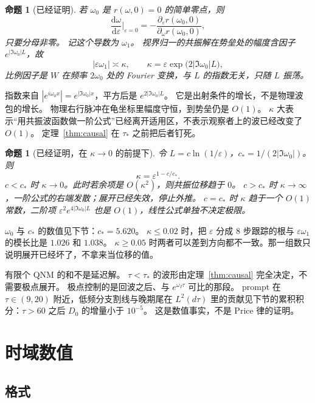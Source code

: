 \documentclass[11pt]{ctexart}
\newtheorem{proposition}[theorem]{命题}
\theoremstyle{definition}
\theoremstyle{remark}
\newcommand{\eps}{\varepsilon}
\newcommand{\rd}{\mathrm{d}}
\begin{document}
\begin{proposition}[已经证明]
\label{prop:shift}
若 $\omega_0$ 是 $r(\omega,0)=0$ 的简单零点，则
\[
\frac{\rd\omega}{\rd\eps}\Big|_{\eps=0}
=-\frac{\partial_\eps r(\omega_0,0)}{\partial_\omega r(\omega_0,0)},
\]
只要分母非零。
记这个导数为 $\omega_1$。
视界归一的共振解在势垒处的幅度含因子 $e^{|\Im\omega_0|L}$，故
\[
|\eps\omega_1|\asymp\kappa,\qquad\kappa=\eps\exp\bigl(2|\Im\omega_0|L\bigr),
\]
比例因子是 $W$ 在频率 $2\omega_0$ 处的 Fourier 变换，与 $L$ 的指数无关，只随 $L$ 振荡。
\end{proposition}

指数来自 $|e^{i\omega_0 x}|=e^{|\Im\omega_0|x}$，平方后是 $e^{2|\Im\omega_0|L}$。
它是出射条件的增长，不是物理波包的增长。
物理右行脉冲在龟坐标里幅度守恒，到势垒仍是 $O(1)$。
$\kappa$ 大表示“用共振波函数做一阶公式”已经离开适用区，不表示观察者上的波已经改变了 $O(1)$。
定理~\ref{thm:causal} 在 $\tau_*$ 之前把后者钉死。

\begin{proposition}[已经证明，在 $\kappa\to0$ 的前提下]
\label{prop:double}
令 $L=c\ln(1/\eps)$，$c_*=1/(2|\Im\omega_0|)$。则
\[
\kappa=\eps^{1-c/c_*}.
\]
$c<c_*$ 时 $\kappa\to0$。此时若余项是 $O(\kappa^2)$，则共振位移趋于 $0$。
$c>c_*$ 时 $\kappa\to\infty$，一阶公式的右端发散；展开已经失效，停止外推。
$c=c_*$ 时 $\kappa$ 趋于一个 $O(1)$ 常数，二阶项 $\eps^2 e^{4|\Im\omega_0|L}$ 也是 $O(1)$，线性公式单独不决定极限。
\end{proposition}

$\omega_0$ 与 $c_*$ 的数值见下节：$c_*=5.620$。
$\kappa\le0.02$ 时，把 $\eps$ 分成 $8$ 步跟踪的根与 $\eps\omega_1$ 的模长比是 $1.026$ 和 $1.038$。
$\kappa\ge0.05$ 时两者可以差到方向都不一致。那一组数只说明展开已经坏了，不拿来当位移的值。

有限个 QNM 的和不是延迟解。
$\tau<\tau_*$ 的波形由定理~\ref{thm:causal} 完全决定，不需要极点展开。
极点控制的是回波之后、与 $e^{\omega_I\tau}$ 可比的那段。
prompt 在 $\tau\in(9,20)$ 附近，低频分支割线与晚期尾在 $L^2(d\tau)$ 里的贡献见下节的累积积分：$\tau>60$ 之后 $D_0$ 的增量小于 $10^{-5}$。
这是数值事实，不是 Price 律的证明。

\section{时域数值}
\label{sec:num}

\subsection{格式}
\end{document}
